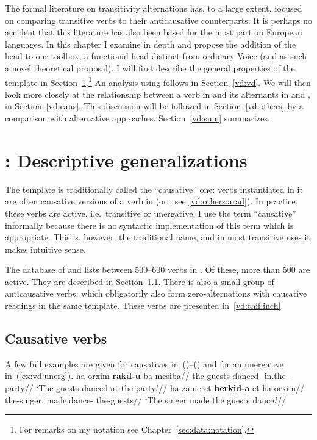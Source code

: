 The formal literature on transitivity alternations has, to a large extent, focused on comparing transitive verbs to their anticausative counterparts. It is perhaps no accident that this literature has also been based for the most part on European languages. In this chapter I examine {\thif} in depth and propose the addition of the head {\vd} to our toolbox, a functional head distinct from ordinary Voice (and as such a novel theoretical proposal). I will first describe the general properties of the template {\thif} in Section~\ref{vd:thif}.\footnote{For remarks on my notation see Chapter~\ref{sec:data:notation}.} An analysis using {\vd} follows in Section~\ref{vd:vd}. We will then look more closely at the relationship between a verb in {\tkal} and its alternants in {\tnif} and {\thif}, in Section~\ref{vd:caus}. This discussion will be followed in Section~\ref{vd:others} by a comparison with alternative approaches. Section~\ref{vd:sum} summarizes.


\section{\thif: Descriptive generalizations} \label{vd:thif}
The template {\thif} is traditionally called the ``causative'' one: verbs instantiated in it are often causative versions of a verb in {\tkal} (or {\tnif}; see \ref{vd:others:arad}). In practice, these verbs are active, i.e.~transitive or unergative. I use the term ``causative'' informally because there is no syntactic implementation of this term which is appropriate. This is, however, the traditional name, and in most transitive uses it makes intuitive sense.

The database of \cite{ehrenfeld12} and \cite{ahdout19phd} lists between 500--600 verbs in {\thif}. Of these, more than 500 are active. They are described in Section~\ref{vd:thif:caus}. There is also a small group of anticausative verbs, which obligatorily also form zero-alternations with causative readings in the same template. These verbs are presented in~\ref{vd:thif:inch}.

	\subsection{Causative verbs} \label{vd:thif:caus}
A few full examples are given for causatives in~(\nextx)--(\anextx) and for an unergative in~(\ref{ex:vd:unerg}).
\pex
	\a \begingl
		\gla ha-orxim \textbf{rakd-u} ba-mesiba//
		\glb the-guests danced- in.the-party//
		\glft `The guests danced at the party.'//
	\endgl
	\a \begingl
		\gla ha-zameret \textbf{herkid-a} et ha-orxim//
		\glb the-singer. made.dance-  the-guests//
		\glft `The singer made the guests dance.'//
	\endgl
\xe

